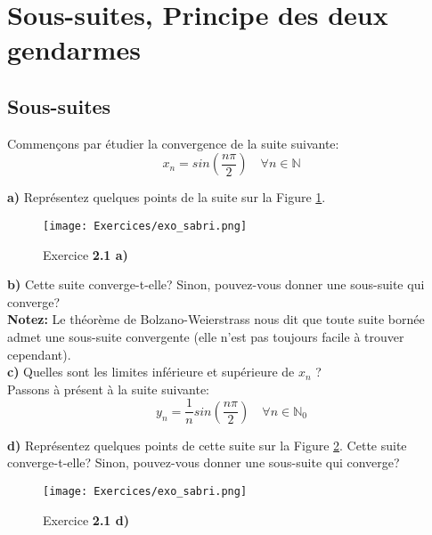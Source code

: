 \documentclass[a4paper, 12pt, french, twoside]{article}
\newcommand{\Nn}{{\mathbb{N}}}
\begin{document}
\section{Sous-suites, Principe des deux gendarmes}

\subsection{Sous-suites}
Commençons par étudier la convergence de la suite suivante:
\begin{equation}
    x_n = sin(\frac{n \pi}{2}) \quad \forall n\in \Nn
\end{equation}

\textbf{a)} Représentez quelques points de la suite sur la Figure \ref{fig:exo2.1a}.\\

\begin{figure}[H]
    \centering
    \texttt{[image: Exercices/exo\_sabri.png]}
    \caption{Exercice \textbf{2.1 a)}}
    \label{fig:exo2.1a}
\end{figure}

\textbf{b)} Cette suite converge-t-elle? Sinon, pouvez-vous donner une sous-suite qui converge? \\
\textbf{Notez:} Le théorème de Bolzano-Weierstrass nous dit que toute suite bornée admet une sous-suite convergente (elle n'est pas toujours facile à trouver cependant). \\

\textbf{c)} Quelles sont les limites inférieure et supérieure de $x_n$ ? \\

Passons à présent à la suite suivante:
\begin{equation}
    y_n = \frac{1}{n} sin(\frac{n \pi}{2}) \quad \forall n\in \Nn_0
    \label{exo_sous_suite}
\end{equation}

\textbf{d)} Représentez quelques points de cette suite sur la Figure \ref{fig:exo2.1d}. Cette suite converge-t-elle? Sinon, pouvez-vous donner une sous-suite qui converge? \\

\begin{figure}[H]
    \centering
    \texttt{[image: Exercices/exo\_sabri.png]}
    \caption{Exercice \textbf{2.1 d)}}
    \label{fig:exo2.1d}
\end{figure}\\ \\
\end{document}
